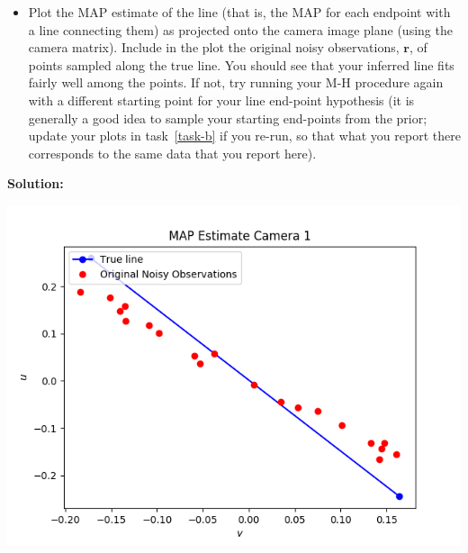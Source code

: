 \documentclass[10pt]{article}
\begin{document}
\begin{enumerate}
\begin{itemize}
\item Plot the MAP estimate of the line (that is, the MAP for each endpoint with a line connecting them) as projected onto the camera image plane (using the camera matrix).  Include in the plot the original noisy observations, $\mathbf{r}$, of points sampled along the true line.  You should see that your inferred line fits fairly well among the points.  If not, try running your M-H procedure again with a different starting point for your line end-point hypothesis (it is generally a good idea to sample your starting end-points from the prior; update your plots in task~\ref{task-b} if you re-run, so that what you report there corresponds to the same data that you report here).

\end{itemize}

\textbf{Solution:}

\includegraphics{figures/map_cam1.png}


\end{enumerate}
\end{document}
